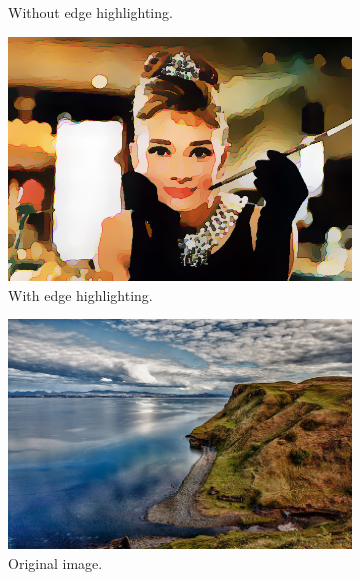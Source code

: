 \documentclass[abstracton]{scrreprt}
\begin{document}
\begin{figure}[!ht]
\begin{subfigure}[b]{0.32\textwidth}
                    \caption{Without edge highlighting.}
                \end{subfigure}
                \begin{subfigure}[b]{0.32\textwidth}
                    \includegraphics[width=\textwidth]{img/cartooning/best_pwc_hepburn_eh.png}
                    \caption{With edge highlighting.}
                \end{subfigure}
                \begin{subfigure}[b]{0.32\textwidth}
                    \includegraphics[width=\textwidth]{img/images/landscape.png}
                    \caption{Original image.}
                \end{subfigure}
                \begin{subfigure}[b]{0.32\textwidth}

\end{subfigure}
\end{figure}
\end{document}
